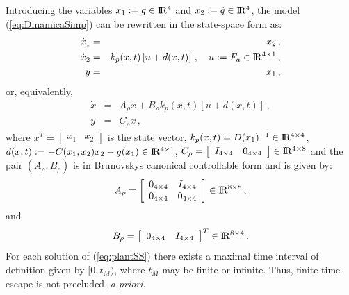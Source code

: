 \documentclass[letterpaper, 10 pt, conference]{ieeeconf}  %
\def\re{{\rm I}\! {\rm R}}
\theoremstyle{plain}
\theoremstyle{definition}
\theoremstyle{remark}
\begin{document}
Introducing the variables $x_1:=q \in \re^4$ and $x_2:=\dot{q}\in \re^4$, the model (\ref{eq:DinamicaSimp}) can be rewritten in the state-space form as:
%
\begin{eqnarray}
\dot{x}_1&=& x_2\,, \\
\dot{x}_2 &=& k_p(x,t) \left[u+d(x,t)\right]\,, \quad u:=F_a \in \re^{4 \times 1}\,,\\
y &=&  x_1\,,
\end{eqnarray}
%
or, equivalently, 
%
\begin{eqnarray}
\dot{x} &=& A_\rho x +  B_\rho k_p(x,t) [u + d(x,t)]\,, \label{eq:plantSS} \\
y &=& C_\rho x\,,\label{eq:plantSaida} 
\end{eqnarray}
%
where $x^T= \left [ \begin{array}{cc} x_1 & x_2\end{array} \right ]$ is the state vector, $k_p(x,t)=D(x_1)^{-1} \in \re^{4 \times 4}$, $d(x,t):=-C(x_1,x_2) x_2-g(x_1) \in \re^{4 \times 1}$, $C_\rho=\left[\begin{array}{cc} I_{4 \times 4} & 0_{4 \times 4}\end{array} \right] \in \re^{4 \times 8}$ and the pair $(A_\rho, B_\rho)$ is in Brunovskys canonical controllable form and is given by:
%
$$A_\rho=\left[\begin{array}{cccc} 0_{4 \times 4} & I_{4 \times 4}\\
0_{4 \times 4} & 0_{4 \times 4}\end{array} \right] \in \re^{8 \times 8}\,,$$
%
and
%
$$B_\rho=\left[\begin{array}{cc}  0_{4 \times 4} & I_{4 \times 4} \end{array} \right]^T \in \re^{8 \times 4}\,.$$
%
For each solution of (\ref{eq:plantSS}) there exists a maximal
time interval of definition given by $[0,t_M)$, where $t_M$ may be
finite or infinite. Thus, finite-time escape is not precluded, {\em
a priori}.

\medskip
\end{document}
